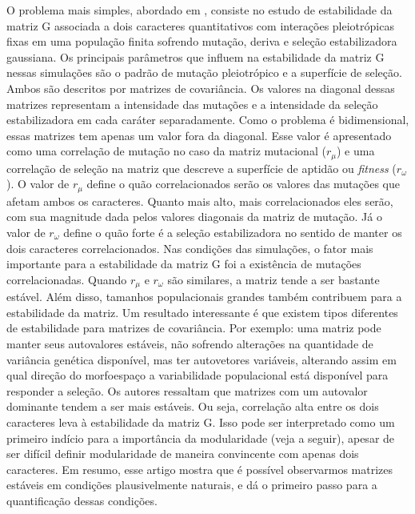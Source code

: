O problema mais simples, abordado em \cite{Jones2003}, consiste no
estudo de estabilidade da matriz G associada a dois caracteres
quantitativos com interações pleiotrópicas fixas em uma população finita
sofrendo mutação, deriva e seleção estabilizadora gaussiana. 
Os principais parâmetros que influem na estabilidade da matriz G nessas
simulações são o padrão de mutação pleiotrópico e a superfície de
seleção. 
Ambos são descritos por matrizes de covariância. 
Os valores na diagonal dessas matrizes representam a intensidade das
mutações e a intensidade da seleção estabilizadora em cada caráter
separadamente. 
Como o problema é bidimensional, essas matrizes tem apenas um valor fora
da diagonal. 
Esse valor é apresentado como uma correlação de mutação no caso da
matriz mutacional ($r_\mu$) e uma correlação de seleção na matriz que
descreve a superfície de aptidão ou {\it fitness} ($r_\omega$). 
O valor de $r_\mu$ define o quão correlacionados serão os valores das
mutações que afetam ambos os caracteres. 
Quanto mais alto, mais correlacionados eles serão, com sua magnitude
dada pelos valores diagonais da matriz de mutação. 
Já o valor de $r_\omega$ define o quão forte é a seleção estabilizadora
no sentido de manter os dois caracteres correlacionados. 
Nas condições das simulações, o fator mais importante para a
estabilidade da matriz G foi a existência de mutações correlacionadas. 
Quando $r_\mu$ e $r_\omega$ são similares, a matriz tende a ser bastante
estável. 
Além disso, tamanhos populacionais grandes também contribuem para a
estabilidade da matriz. 
Um resultado interessante é que existem tipos diferentes de estabilidade
para matrizes de covariância. 
Por exemplo: uma matriz pode manter seus autovalores estáveis, não
sofrendo alterações na quantidade de variância genética disponível, mas
ter autovetores variáveis, alterando assim em qual direção do
morfoespaço a variabilidade populacional está disponível para responder
a seleção. 
Os autores ressaltam que matrizes com um autovalor dominante tendem a
ser mais estáveis. 
Ou seja, correlação alta entre os dois caracteres leva à estabilidade da
matriz G. 
Isso pode ser interpretado como um primeiro indício para a importância
da modularidade (veja a seguir), apesar de ser difícil definir
modularidade de maneira convincente com apenas dois caracteres. 
Em resumo, esse artigo mostra que é possível observarmos matrizes
estáveis em condições plausivelmente naturais, e dá o primeiro passo
para a quantificação dessas condições. 

